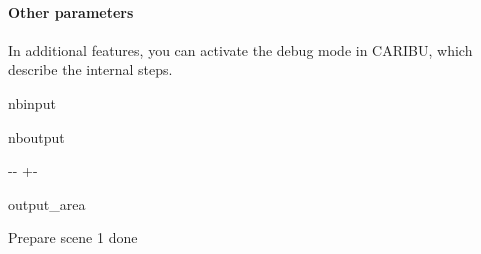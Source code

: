 \documentclass[letterpaper,10pt,english]{sphinxmanual}
\begin{document}
\paragraph{Other parameters}
\label{\detokenize{lightmodels_functionnalities:Other-parameters}}
\sphinxAtStartPar
In additional features, you can activate the debug mode in CARIBU, which describe the internal steps.

\begin{sphinxuseclass}{nbinput}
{
\begin{sphinxVerbatim}[commandchars=\\\{\}]
\llap{\color{nbsphinxin}[6]:\,\hspace{\fboxrule}\hspace{\fboxsep}}      

   
\PYG{p}{[}        \PYG{p}{]}

  
  
  
  
\end{sphinxVerbatim}
}

\end{sphinxuseclass}
\begin{sphinxuseclass}{nboutput}
{

\kern-\sphinxverbatimsmallskipamount\kern-\baselineskip
\kern+\FrameHeightAdjust\kern-\fboxrule
\vspace{\nbsphinxcodecellspacing}

\begin{sphinxuseclass}{output_area}
\begin{sphinxuseclass}{}


\begin{sphinxVerbatim}[commandchars=\\\{\}]
Prepare scene 1
done
\end{sphinxVerbatim}



\end{sphinxuseclass}
\end{sphinxuseclass}
}

\end{sphinxuseclass}
\end{document}
